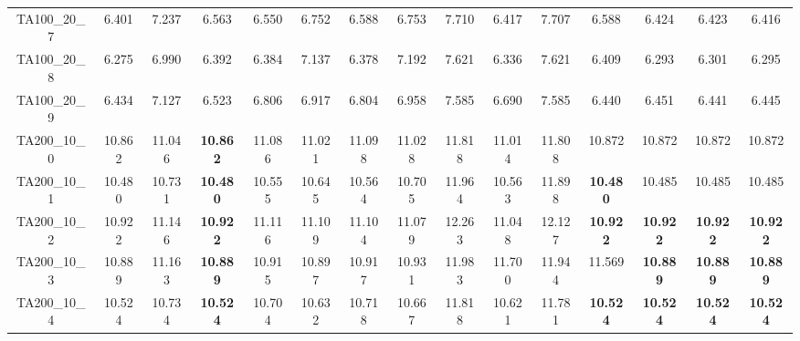 \begin{tabular}{cc||ccccccccccccc}
TA100\_20\_7       & 6.401            & 7.237            & 6.563            & 6.550            & 6.752            & 6.588            & 6.753            & 7.710            & 6.417            & 7.707            & 6.588            & 6.424            & 6.423            & 6.416           \\ 
TA100\_20\_8       & 6.275            & 6.990            & 6.392            & 6.384            & 7.137            & 6.378            & 7.192            & 7.621            & 6.336            & 7.621            & 6.409            & 6.293            & 6.301            & 6.295           \\ 
TA100\_20\_9       & 6.434            & 7.127            & 6.523            & 6.806            & 6.917            & 6.804            & 6.958            & 7.585            & 6.690            & 7.585            & 6.440            & 6.451            & 6.441            & 6.445           \\ 
TA200\_10\_0       & 10.862           & 11.046           & {\bf 10.862}     & 11.086           & 11.021           & 11.098           & 11.028           & 11.818           & 11.014           & 11.808           & 10.872           & 10.872           & 10.872           & 10.872          \\ 
TA200\_10\_1       & 10.480           & 10.731           & {\bf 10.480}     & 10.555           & 10.645           & 10.564           & 10.705           & 11.964           & 10.563           & 11.898           & {\bf 10.480}     & 10.485           & 10.485           & 10.485          \\ 
TA200\_10\_2       & 10.922           & 11.146           & {\bf 10.922}     & 11.116           & 11.109           & 11.104           & 11.079           & 12.263           & 11.048           & 12.127           & {\bf 10.922}     & {\bf 10.922}     & {\bf 10.922}     & {\bf 10.922}    \\ 
TA200\_10\_3       & 10.889           & 11.163           & {\bf 10.889}     & 10.915           & 10.897           & 10.917           & 10.931           & 11.983           & 11.700           & 11.944           & 11.569           & {\bf 10.889}     & {\bf 10.889}     & {\bf 10.889}    \\ 
TA200\_10\_4       & 10.524           & 10.734           & {\bf 10.524}     & 10.704           & 10.632           & 10.718           & 10.667           & 11.818           & 10.621           & 11.781           & {\bf 10.524}     & {\bf 10.524}     & {\bf 10.524}     & {\bf 10.524}    \\ 

\end{tabular}
